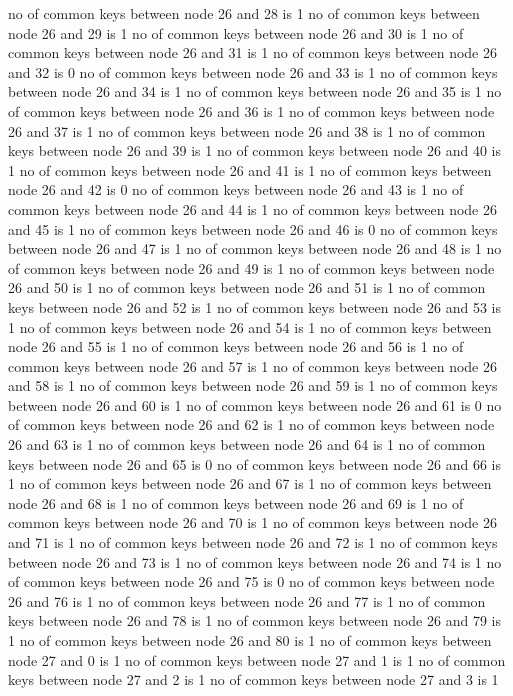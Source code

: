 no of common keys between node 26 and 28 is 1
no of common keys between node 26 and 29 is 1
no of common keys between node 26 and 30 is 1
no of common keys between node 26 and 31 is 1
no of common keys between node 26 and 32 is 0
no of common keys between node 26 and 33 is 1
no of common keys between node 26 and 34 is 1
no of common keys between node 26 and 35 is 1
no of common keys between node 26 and 36 is 1
no of common keys between node 26 and 37 is 1
no of common keys between node 26 and 38 is 1
no of common keys between node 26 and 39 is 1
no of common keys between node 26 and 40 is 1
no of common keys between node 26 and 41 is 1
no of common keys between node 26 and 42 is 0
no of common keys between node 26 and 43 is 1
no of common keys between node 26 and 44 is 1
no of common keys between node 26 and 45 is 1
no of common keys between node 26 and 46 is 0
no of common keys between node 26 and 47 is 1
no of common keys between node 26 and 48 is 1
no of common keys between node 26 and 49 is 1
no of common keys between node 26 and 50 is 1
no of common keys between node 26 and 51 is 1
no of common keys between node 26 and 52 is 1
no of common keys between node 26 and 53 is 1
no of common keys between node 26 and 54 is 1
no of common keys between node 26 and 55 is 1
no of common keys between node 26 and 56 is 1
no of common keys between node 26 and 57 is 1
no of common keys between node 26 and 58 is 1
no of common keys between node 26 and 59 is 1
no of common keys between node 26 and 60 is 1
no of common keys between node 26 and 61 is 0
no of common keys between node 26 and 62 is 1
no of common keys between node 26 and 63 is 1
no of common keys between node 26 and 64 is 1
no of common keys between node 26 and 65 is 0
no of common keys between node 26 and 66 is 1
no of common keys between node 26 and 67 is 1
no of common keys between node 26 and 68 is 1
no of common keys between node 26 and 69 is 1
no of common keys between node 26 and 70 is 1
no of common keys between node 26 and 71 is 1
no of common keys between node 26 and 72 is 1
no of common keys between node 26 and 73 is 1
no of common keys between node 26 and 74 is 1
no of common keys between node 26 and 75 is 0
no of common keys between node 26 and 76 is 1
no of common keys between node 26 and 77 is 1
no of common keys between node 26 and 78 is 1
no of common keys between node 26 and 79 is 1
no of common keys between node 26 and 80 is 1
no of common keys between node 27 and 0 is 1
no of common keys between node 27 and 1 is 1
no of common keys between node 27 and 2 is 1
no of common keys between node 27 and 3 is 1
